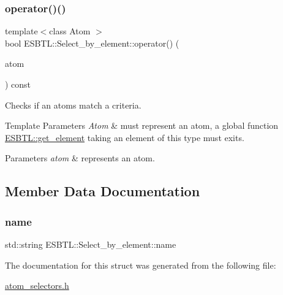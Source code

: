 \subsubsection{\texorpdfstring{operator()()}{operator()()}}
{\footnotesize\ttfamily template$<$class Atom $>$ \\
bool E\+S\+B\+T\+L\+::\+Select\+\_\+by\+\_\+element\+::operator() (\begin{DoxyParamCaption}\item[{const Atom \&}]{atom }\end{DoxyParamCaption}) const\hspace{0.3cm}{\ttfamily [inline]}}

Checks if an atoms match a criteria. 
\begin{DoxyTemplParams}{Template Parameters}
{\em Atom} & must represent an atom, a global function \hyperlink{namespaceESBTL_a0c43740d66a09673579487dc0dfe1634}{E\+S\+B\+T\+L\+::get\+\_\+element} taking an element of this type must exits. \\
\hline
\end{DoxyTemplParams}

\begin{DoxyParams}{Parameters}
{\em atom} & represents an atom. \\
\hline
\end{DoxyParams}


\subsection{Member Data Documentation}
\mbox{\label{structESBTL_1_1Select__by__element_a921e6fd868ecdd16e14722dba0c16591}} 
\subsubsection{\texorpdfstring{name}{name}}
{\footnotesize\ttfamily std\+::string E\+S\+B\+T\+L\+::\+Select\+\_\+by\+\_\+element\+::name}



The documentation for this struct was generated from the following file\+:\begin{DoxyCompactItemize}
\item 
\hyperlink{atom__selectors_8h}{atom\+\_\+selectors.\+h}\end{DoxyCompactItemize}
